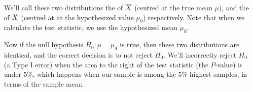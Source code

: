 \begin{center}
\end{center}

We'll call these two distributions the  of ${\overline{X}}$ (centred at the true mean $\mu$), and the  of ${\overline{X}}$ (centred at at the hypothesized value $\mu_0$) respectively. Note that when we calculate the test statistic, we use the hypothesized mean $\mu_0$.

Now if the null hypothesis $H_0: \mu = \mu_0$ is true, then these two distributions are identical, and the correct decision is to not reject $H_0$. We'll incorrectly reject $H_0$ (a Type I error) when the area to the right of the test statistic (the $P$-value) is under $5\%$, which happens when our sample is among the $5\%$ highest samples, in terms of the sample mean.

